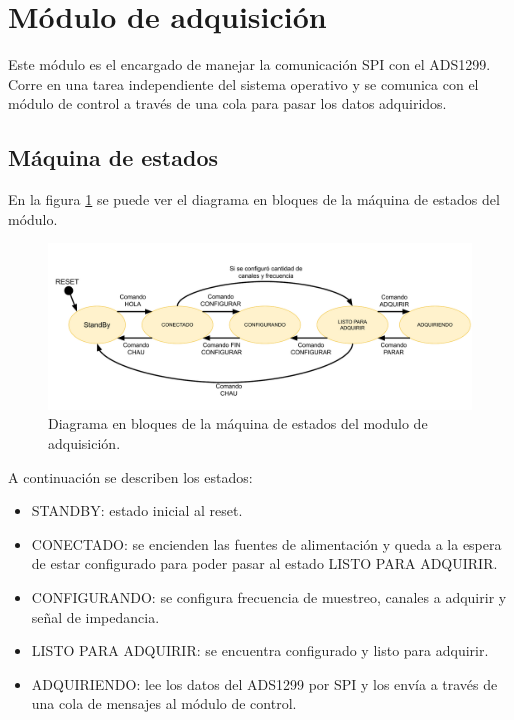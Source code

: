 \section{Módulo de adquisición}
Este módulo es el encargado de manejar la comunicación SPI con el ADS1299. Corre en una tarea independiente del sistema operativo y se comunica con el módulo de control a través de una cola para pasar los datos adquiridos.


\subsection{Máquina de estados}

En la figura \ref{fig:DiagramaEstados} se puede ver el diagrama en bloques de la máquina de estados del módulo.

\vspace{1cm}
\begin{figure}[htbp]
	\centering
	\includegraphics[width=1\textwidth]{./Figures/MEFads1299.pdf}
	\caption{Diagrama en bloques de la máquina de estados del modulo de adquisición.}
	\label{fig:DiagramaEstados}
\end{figure}
\vspace{1cm}

A continuación se describen los estados:
\begin{itemize}
\item STANDBY: estado inicial al reset.
\item CONECTADO: se encienden las fuentes de alimentación y queda a la espera de estar configurado para poder pasar al estado LISTO PARA ADQUIRIR.
\item CONFIGURANDO: se configura frecuencia de muestreo, canales a adquirir y señal de impedancia.
\item LISTO PARA ADQUIRIR: se encuentra configurado y listo para adquirir.
\item ADQUIRIENDO: lee los datos del ADS1299 por SPI y los envía a través de una cola de mensajes al módulo de control.
\end{itemize}

